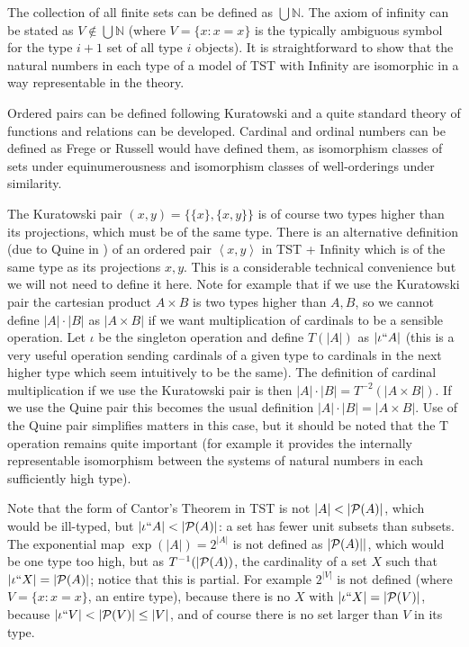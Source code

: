 \documentclass[112pt]{article}
\begin{document}
The collection of all finite sets can be defined as $\bigcup \mathbb N$.  The axiom of infinity can be stated as $V \not\in \bigcup \mathbb N$ (where $V= \{x:x=x\}$ is the typically ambiguous symbol for the type $i+1$ set of all type $i$ objects).  It is straightforward to show that the natural numbers in each type of a model of TST with Infinity are isomorphic in a way representable in the theory.

Ordered pairs can be defined following Kuratowski and a quite standard theory of functions and relations can be developed.  Cardinal and ordinal numbers can be defined as Frege or Russell would have defined them, as isomorphism classes of sets under equinumerousness and isomorphism classes of well-orderings under similarity.  

The Kuratowski pair $(x,y) = \{\{x\},\{x,y\}\}$ is of course two types higher than its projections, which must be of the same type.  There is an alternative definition (due to Quine in \cite{quinepair}) of an ordered pair
$\left< x,y\right>$ in TST + Infinity which is of the same type as its projections $x,y$.  This is a considerable technical convenience but we will not need to define it here.  Note for example that if we use the Kuratowski pair the cartesian product $A \times B$ is two types higher than $A,B$, so we cannot define $|A| \cdot |B|$ as $|A \times B|$ if we want multiplication of cardinals to be a sensible operation.  Let $\iota$ be the singleton operation and define $T(|A|)$ as $|\iota``A|$ (this is a very useful operation sending cardinals of a given type to cardinals in the next higher type which seem intuitively to be the same).  The definition of cardinal multiplication if we use the Kuratowski pair is then $|A| \cdot |B| =T^{-2}(|A\times B|)$.  If we use the Quine pair this becomes the usual definition $|A| \cdot |B| =|A\times B|$.  Use of the Quine pair simplifies matters in this case, but it should be noted that the T operation remains quite important (for example it provides the internally representable isomorphism between the systems of natural numbers in each sufficiently high type).

Note that the form of Cantor's Theorem in TST is not $|A| < |{\cal P}(A)|$, which would be ill-typed, but $|\iota``A|<|{\cal P}(A)|$:  a set has fewer unit subsets than subsets.  The exponential map $\exp(|A|) = 2^{|A|}$ is not defined as $|{\cal P}(A)||$, which would be one type too high, but as $T^{-1}(|{\cal P}(A))$, the cardinality of a set $X$ such that $|\iota``X| = |{\cal P}(A)|$;   notice that this is partial.  For example
$2^{|V|}$ is not defined (where $V=\{x:x=x\}$, an entire type), because there is no $X$ with $|\iota``X|=|{\cal P}(V)|$, because $|\iota``V|<|{\cal P}(V)| \leq |V|$, and of course there is no set larger than $V$ in its type.
\end{document}
